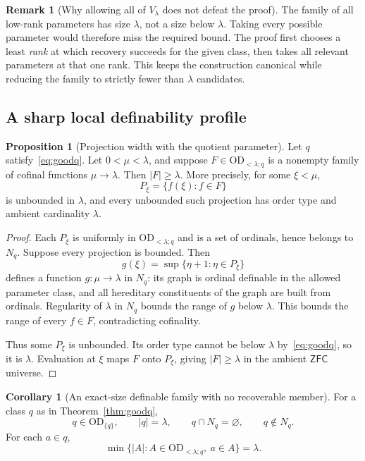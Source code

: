 \documentclass[11pt,letterpaper]{article}
\theoremstyle{definition}
\newtheorem{proposition}[definition]{Proposition}
\newtheorem{corollary}[definition]{Corollary}
\newtheorem{remark}[definition]{Remark}
\numberwithin{equation}{section}
\newcommand{\ZFC}{\mathsf{ZFC}}
\newcommand{\OD}{\mathrm{OD}}
\newcommand{\ODq}{\OD_{<\lambda;q}}
\newcommand{\ODone}[1]{\OD_{\{#1\}}}
\begin{document}
\begin{remark}[Why allowing all of $V_\lambda$ does not defeat the proof]
The family of all low-rank parameters has size $\lambda$, not a size below $\lambda$. Taking every possible parameter would therefore miss the required bound. The proof first chooses a least \emph{rank} at which recovery succeeds for the given class, then takes all relevant parameters at that one rank. This keeps the construction canonical while reducing the family to strictly fewer than $\lambda$ candidates.
\end{remark}

\subsection{A sharp local definability profile}

\begin{proposition}[Projection width with the quotient parameter]\label{prop:relativewidth}
Let $q$ satisfy~\eqref{eq:goodq}. Let $0<\mu<\lambda$, and suppose $F\in\ODq$ is a nonempty family of cofinal functions $\mu\to\lambda$. Then $|F|\ge\lambda$. More precisely, for some $\xi<\mu$,
\[
P_\xi=\{f(\xi):f\in F\}
\]
is unbounded in $\lambda$, and every unbounded such projection has order type and ambient cardinality $\lambda$.
\end{proposition}

\begin{proof}
Each $P_\xi$ is uniformly in $\ODq$ and is a set of ordinals, hence belongs to $N_q$. Suppose every projection is bounded. Then
\[
g(\xi)=\sup\{\eta+1:\eta\in P_\xi\}
\]
defines a function $g:\mu\to\lambda$ in $N_q$: its graph is ordinal definable in the allowed parameter class, and all hereditary constituents of the graph are built from ordinals. Regularity of $\lambda$ in $N_q$ bounds the range of $g$ below $\lambda$. This bounds the range of every $f\in F$, contradicting cofinality.

Thus some $P_\xi$ is unbounded. Its order type cannot be below $\lambda$ by~\eqref{eq:goodq}, so it is $\lambda$. Evaluation at $\xi$ maps $F$ onto $P_\xi$, giving $|F|\ge\lambda$ in the ambient $\ZFC$ universe.
\end{proof}

\begin{corollary}[An exact-size definable family with no recoverable member]\label{cor:exactcloud}
For a class $q$ as in Theorem~\ref{thm:goodq},
\[
q\in\ODone q,\qquad |q|=\lambda,\qquad q\cap N_q=\varnothing,
\qquad q\notin N_q.
\]
For each $a\in q$,
\begin{equation}\label{eq:mincover}
\min\{|A|:A\in\ODq,\ a\in A\}=\lambda.
\end{equation}
\end{corollary}
\end{document}
